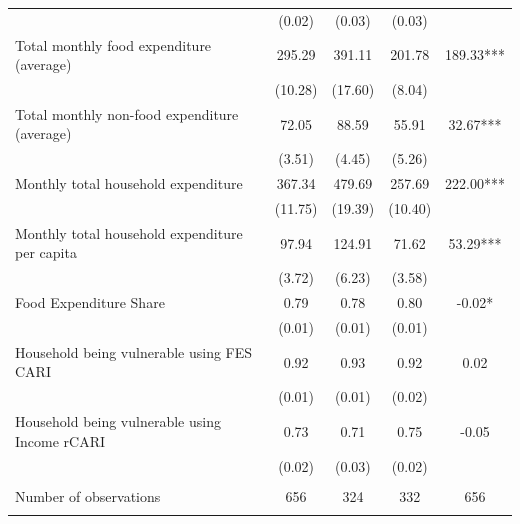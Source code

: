 \begin{tabular}{@{\extracolsep{5pt}}lcccc}
 & (0.02)  & (0.03)  & (0.03)  &  \\ [1ex]
Total monthly food expenditure (average)   & 295.29    & 391.11    & 201.78    & 189.33***   \\
 & (10.28)  & (17.60)  & (8.04)  &  \\ [1ex]
Total monthly non-food expenditure (average)   & 72.05    & 88.59    & 55.91    & 32.67***   \\
 & (3.51)  & (4.45)  & (5.26)  &  \\ [1ex]
Monthly total household expenditure   & 367.34    & 479.69    & 257.69    & 222.00***   \\
 & (11.75)  & (19.39)  & (10.40)  &  \\ [1ex]
Monthly total household expenditure per capita   & 97.94    & 124.91    & 71.62    & 53.29***   \\
 & (3.72)  & (6.23)  & (3.58)  &  \\ [1ex]
Food Expenditure Share   & 0.79    & 0.78    & 0.80    & -0.02*   \\
 & (0.01)  & (0.01)  & (0.01)  &  \\ [1ex]
Household being vulnerable using FES CARI   & 0.92    & 0.93    & 0.92    & 0.02   \\
 & (0.01)  & (0.01)  & (0.02)  &  \\ [1ex]
Household being vulnerable using Income rCARI   & 0.73    & 0.71    & 0.75    & -0.05   \\
 & (0.02)  & (0.03)  & (0.02)  &  \\ [1ex]
\hline \\[-1.8ex]
Number of observations  & 656   & 324   & 332  & 656  \\
\hline \hline \\[-1.8ex]

\end{tabular}
